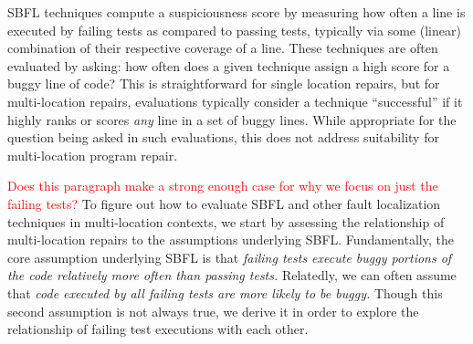 \documentclass[10pt, conference]{IEEEtran}
\newcommand\todo[1]{\textcolor{red}{#1}}
\begin{document}
SBFL techniques compute a suspiciousness score by
measuring how often a line is executed by failing tests as compared to passing
tests, typically via some (linear) combination of their respective
coverage of a line. 
These techniques are often evaluated by asking: how often does a given technique assign a high 
score for a buggy line of code? This is straightforward for single location repairs, but for 
multi-location repairs, evaluations
typically consider a technique ``successful'' if it highly ranks or scores \emph{any} line in a
set of buggy lines. 
While appropriate for the question being asked in such evaluations, this does not address
suitability for multi-location program repair.%

\todo{Does this paragraph make a strong enough case for why we focus on just the failing 
tests?}
To figure out how to evaluate SBFL and other fault localization techniques 
in multi-location contexts, we start by assessing the 
relationship of multi-location repairs to the assumptions underlying SBFL. 
Fundamentally, the core assumption underlying SBFL is that \emph{failing tests
execute buggy portions of the code relatively more often than passing tests.} Relatedly, we can 
often assume that \emph{code executed by all failing tests are more likely to be buggy.} Though 
this second assumption is not 
always true, we derive it in order to explore the relationship of failing test executions with each 
other.




\end{document}
